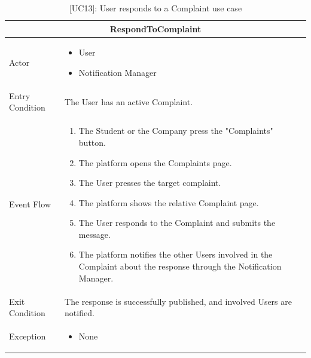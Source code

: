 \begin{table}[H]
    \centering
    \begin{tabular}{|p{3cm}|p{12cm}|}
    \hline
    \multicolumn{2}{|c|}{\textbf{RespondToComplaint}} \\ \hline
    Actor & 
    \begin{itemize}
        \item User
        \item Notification Manager
    \end{itemize} \\ \hline
    Entry Condition & The User has an active Complaint.\\ \hline
    Event Flow &      
    \begin{enumerate}         
        \item The Student or the Company press the "Complaints" button.
        \item The platform opens the Complaints page.
        \item The User presses the target complaint.
        \item The platform shows the relative Complaint page.
        \item The User responds to the Complaint and submits the message.
        \item The platform notifies the other Users involved in the Complaint about the response through the Notification Manager.
    \end{enumerate} \\ \hline
    Exit Condition & The response is successfully published, and involved Users are notified.\\ \hline
    Exception & 
    \begin{itemize}       
        \item None
    \end{itemize} \\ \hline
    \end{tabular}
    \caption{[UC13]: User responds to a Complaint use case}
    \label{tab:UC13}
\end{table}


